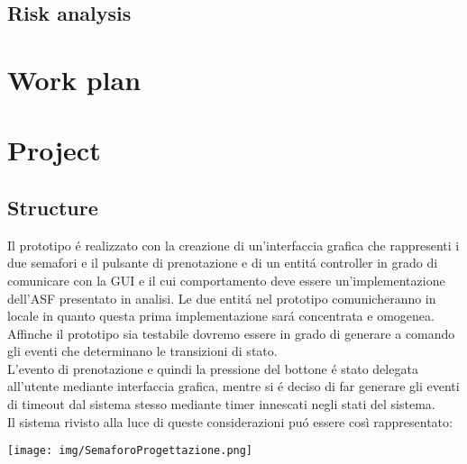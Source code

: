 \documentclass{llncs}
\newcommand{\labelsec}[1]{\label{sec:#1}}
\begin{document}
\subsection{Risk analysis}

\section{Work plan}
\labelsec{wplan}

\section{Project}
\labelsec{Project}

\subsection{Structure}
Il prototipo \'e realizzato con la creazione di un'interfaccia grafica che rappresenti i due semafori e il pulsante di prenotazione e di un entit\'a controller in grado di comunicare con la GUI e il cui comportamento deve essere un'implementazione dell'ASF presentato in analisi. Le due entit\'a nel prototipo comunicheranno in locale in quanto questa prima implementazione sar\'a concentrata e omogenea.\\ 
Affinche il prototipo sia testabile dovremo essere in grado di generare a comando gli eventi che determinano le transizioni di stato. \\
L'evento di prenotazione e quindi la pressione del bottone \'e stato delegata all'utente mediante interfaccia grafica, mentre si \'e deciso di far generare gli eventi di timeout dal sistema stesso mediante timer innescati negli stati del sistema. \\
Il sistema rivisto alla luce di queste considerazioni pu\'o essere così rappresentato:
\begin{center}
	\texttt{[image: img/SemaforoProgettazione.png]}
	\label{fig:Casi Uso}
\end{center}
\end{document}
